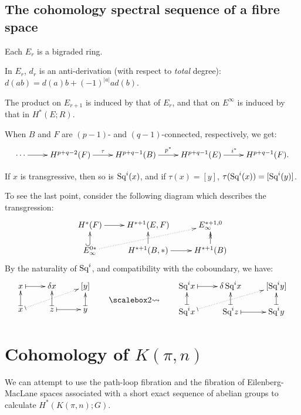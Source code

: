 \documentclass[11pt]{article}
\begin{document}
{\subsection{The cohomology spectral sequence of a fibre space}
\begin{itemise}
\squishlist
\item Each $E_r$ is a bigraded ring.
\item In $E_r$, $d_r$ is an anti-derivation (with respect to \emph{total} degree): $d(ab)=d(a)b+(-1)^{|a|}ad(b)$.
\item The product on $E_{r+1}$ is induced by that of $E_r$, and that on $E^\infty$ is induced by that in $H^*(E;R)$.
\item When $B$ and $F$ are $(p-1)$- and $(q-1)$-connected, respectively, we get:
\[\xymatrix{
\cdots\ar[r]&H^{p+q-2}(F)\ar[r]^\tau&H^{p+q-1}(B)\ar[r]^{p^*}&H^{p+q-1}(E)\ar[r]^{i^*}&H^{p+q-1}(F).
}\]
\item If $x$ is transgressive, then so is $\textup{Sq}^i(x)$, and if $\tau(x)=[y]$, $\tau(\textup{Sq}^i(x))=[\textup{Sq}^i(y)]$.
\end{itemise}
To see the last point, consider the following diagram which describes the transgression:
\[\xymatrix@R=5mm{
H^*(F)\ar[r]&H^{*+1}(E,F)&E_\infty^{*+1,0}\\
E_\infty^{0*}\ar@{^{(}->}[u]\ar@{.>}[rur]&H^{*+1}(B,*)\ar[u]\ar[r]&H^{*+1}(B)\ar@{->>}[u]
}\]
By the naturality of $\textup{Sq}^i$, and compatibility with the coboundary, we have:
\[\xymatrix@R=5mm{
x\ar@{|->}[r]&\delta x&[y]\\
x\ar@{|.>}[rur]\ar@{|->}[u]&z\ar@{|->}[u]\ar@{|->}[r]&y\ar@{|->}[u]
}\raisebox{-.6cm}{\qquad\bigrightsquig\qquad }
\xymatrix@R=5mm{
\Squ^ix\ar@{|->}[r]&\delta\,\Squ^ix&[\Squ^iy]\\
\Squ^ix\ar@{|.>}[rur]\ar@{|->}[u]&\Squ^iz\ar@{|->}[u]\ar@{|->}[r]&\Squ^iy\ar@{|->}[u]
}\]

\section{Cohomology of \texorpdfstring{$K(\pi,n)$}{K(G,n)}}
We can attempt to use the path-loop fibration and the fibration of Eilenberg-MacLane spaces associated with a short exact sequence of abelian groups to calculate $H^*(K(\pi,n);G)$.
}
\end{document}
